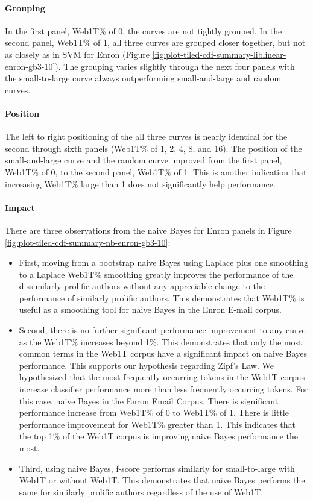 	\paragraph*{Grouping}In the first panel, Web1T\% of 0, the curves are not tightly grouped. In the second panel, Web1T\% of 1, all three curves are grouped closer together, but not as closely as in SVM for Enron (Figure \ref{fig:plot-tiled-cdf-summary-liblinear-enron-gb3-10}).  The grouping varies slightly through the next four panels with the small-to-large curve always outperforming small-and-large and random curves. 
	\paragraph*{Position}The left to right positioning of the all three curves is nearly identical for the second through sixth panels (Web1T\% of 1, 2, 4, 8, and 16).  The position of the small-and-large curve and the random curve improved from the first panel, Web1T\% of 0, to the second panel, Web1T\% of 1.  This is another indication that increasing Web1T\%  large than 1 does not significantly help performance.
	\paragraph*{Impact} There are three observations from the naive Bayes for Enron panels in Figure \ref{fig:plot-tiled-cdf-summary-nb-enron-gb3-10}:
	\begin{itemize}
	\item First, moving from a bootstrap naive Bayes using Laplace plus one smoothing to a Laplace Web1T\% smoothing greatly improves the performance of the dissimilarly prolific authors without any appreciable change to the performance of similarly prolific authors.  This demonstrates that Web1T\% is useful as a smoothing tool for naive Bayes in the Enron E-mail corpus.  
	\item Second, there is no further significant performance improvement to any curve as the Web1T\% increases beyond 1\%.  This demonstrates that only the most common terms in the Web1T corpus have a significant impact on naive Bayes performance. This supports our hypothesis regarding Zipf's Law.  We hypothesized that the most frequently occurring tokens in the Web1T corpus increase classifier performance more than less frequently occurring tokens.  For this case, naive Bayes in the Enron Email Corpus, There is significant performance increase from Web1T\% of 0 to Web1T\% of 1.  There is little performance improvement for Web1T\% greater than 1.  This indicates that the top 1\% of the Web1T corpus is improving naive Bayes performance the most.
	\item Third, using naive Bayes, f-score performs similarly for small-to-large with Web1T or without Web1T.  This demonstrates that naive Bayes performs the same for similarly prolific authors regardless of the use of Web1T.
	\end{itemize}
	
